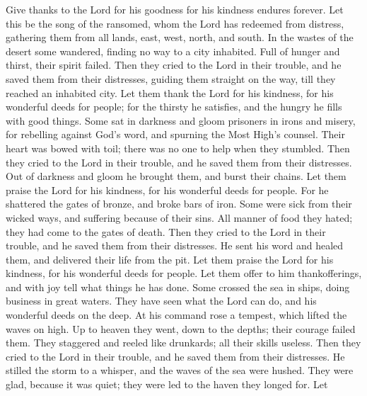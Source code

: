  Give thanks to the Lord for his goodness for his kindness
endures forever.  Let this be the song of the ransomed, whom
the Lord has redeemed from distress,  gathering them from
all lands, east, west, north, and south.  In the wastes of
the desert some wandered, finding no way to a city inhabited.
 Full of hunger and thirst, their spirit failed.
 Then they cried to the Lord in their trouble, and he saved
them from their distresses,  guiding them straight on the
way, till they reached an inhabited city.  Let them thank
the Lord for his kindness, for his wonderful deeds for people;
 for the thirsty he satisfies, and the hungry he fills with
good things.  Some sat in darkness and gloom prisoners in
irons and misery,  for rebelling against God's word, and
spurning the Most High's counsel.  Their heart was bowed
with toil; there was no one to help when they stumbled. 
Then they cried to the Lord in their trouble, and he saved them from
their distresses.  Out of darkness and gloom he brought
them, and burst their chains.  Let them praise the Lord for
his kindness, for his wonderful deeds for people.  For he
shattered the gates of bronze, and broke bars of iron. 
Some were sick from their wicked ways, and suffering because of their
sins.  All manner of food they hated; they had come to the
gates of death.  Then they cried to the Lord in their
trouble, and he saved them from their distresses.  He sent
his word and healed them, and delivered their life from the pit.
 Let them praise the Lord for his kindness, for his
wonderful deeds for people.  Let them offer to him
thankofferings, and with joy tell what things he has done. 
Some crossed the sea in ships, doing business in great waters.
 They have seen what the Lord can do, and his wonderful
deeds on the deep.  At his command rose a tempest, which
lifted the waves on high.  Up to heaven they went, down to
the depths; their courage failed them.  They staggered and
reeled like drunkards; all their skills useless.  Then they
cried to the Lord in their trouble, and he saved them from their
distresses.  He stilled the storm to a whisper, and the
waves of the sea were hushed.  They were glad, because it
was quiet; they were led to the haven they longed for.  Let
